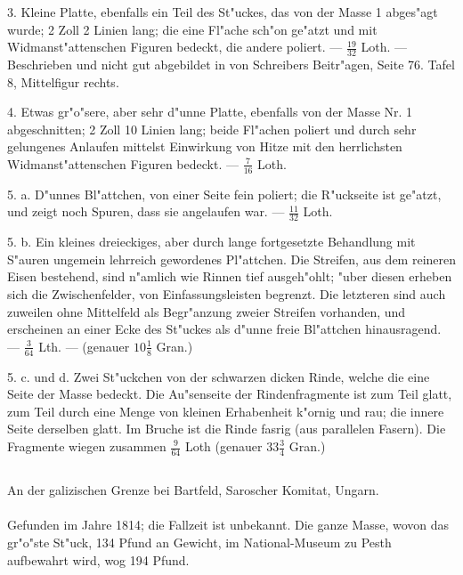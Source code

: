 \documentclass[a4paper, 11pt, oneside, polutonikogreek, german]{article}
\begin{document}
3. Kleine Platte, ebenfalls ein Teil des St"uckes, das von der Masse 1 abges"agt wurde; 2 Zoll 2 Linien lang; die eine Fl"ache sch"on ge"atzt und mit Widmanst"attenschen Figuren bedeckt, die andere poliert. --- $\frac{19}{32}$ Loth. --- Beschrieben und nicht gut abgebildet in von Schreibers Beitr"agen, Seite 76. Tafel 8, Mittelfigur rechts.

4. Etwas gr"o"sere, aber sehr d"unne Platte, ebenfalls von der Masse Nr. 1 abgeschnitten; 2 Zoll 10 Linien lang; beide Fl"achen poliert und durch sehr gelungenes Anlaufen mittelst Einwirkung von Hitze mit den herrlichsten Widmanst"attenschen Figuren bedeckt. --- $\frac{7}{16}$ Loth.

5. a. D"unnes Bl"attchen, von einer Seite fein poliert; die R"uckseite ist ge"atzt, und zeigt noch Spuren, dass sie angelaufen war. --- $\frac{11}{32}$ Loth.

5. b. Ein kleines dreieckiges, aber durch lange fortgesetzte Behandlung mit S"auren ungemein lehrreich gewordenes Pl"attchen. Die Streifen, aus dem reineren Eisen bestehend, sind n"amlich wie Rinnen tief ausgeh"ohlt; "uber diesen erheben sich die Zwischenfelder, von Einfassungsleisten begrenzt. Die letzteren sind auch zuweilen ohne Mittelfeld als Begr"anzung zweier Streifen vorhanden, und erscheinen an einer Ecke des St"uckes als d"unne freie Bl"attchen hinausragend. --- $\frac{3}{64}$ Lth. --- (genauer $10\frac{1}{8}$ Gran.)

5. c. und d. Zwei St"uckchen von der schwarzen dicken Rinde, welche die eine Seite der Masse bedeckt. Die Au"senseite der Rindenfragmente ist zum Teil glatt, zum Teil durch eine Menge von kleinen Erhabenheit k"ornig und rau; die innere Seite derselben glatt. Im Bruche ist die Rinde fasrig (aus parallelen Fasern). Die Fragmente wiegen zusammen $\frac{9}{64}$ Loth (genauer $33\frac{3}{4}$ Gran.)
\subsection{}
\begin{center}

An der galizischen Grenze bei Bartfeld, Saroscher Komitat, Ungarn.
\end{center}
\paragraph{}
Gefunden im Jahre 1814; die Fallzeit ist unbekannt. Die ganze Masse, wovon das gr"o"ste St"uck, 134 Pfund an Gewicht, im National-Museum zu Pesth aufbewahrt wird, wog 194 Pfund.
\end{document}
